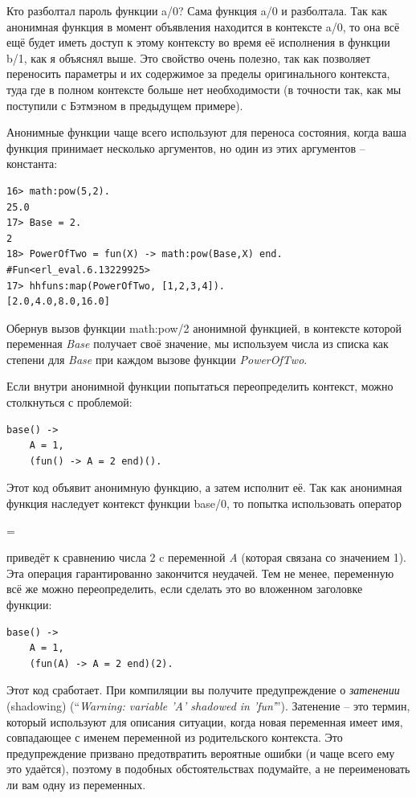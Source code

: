 \documentclass[a4paper,12pt]{report}
\newcommand{\ops}{\colorbox{lgreen}}
\begin{document}
Кто разболтал пароль функции \ops{a/0}? Сама функция \ops{a/0} и разболтала. Так как анонимная функция в момент объявления находится в контексте \ops{a/0}, то она всё ещё будет иметь доступ к этому контексту во время её исполнения в функции \ops{b/1}, как я объяснял выше. Это свойство очень полезно, так как позволяет переносить параметры и их содержимое за пределы оригинального контекста, туда где в полном контексте больше нет необходимости (в точности так, как мы поступили с Бэтмэном в предыдущем примере).

Анонимные функции чаще всего используют для переноса состояния, когда ваша функция принимает несколько аргументов, но один из этих аргументов \--- константа:
\begin{lstlisting}[style=erlang]
16> math:pow(5,2).
25.0
17> Base = 2.
2
18> PowerOfTwo = fun(X) -> math:pow(Base,X) end.
#Fun<erl_eval.6.13229925>
17> hhfuns:map(PowerOfTwo, [1,2,3,4]).
[2.0,4.0,8.0,16.0]
\end{lstlisting}

Обернув вызов функции \ops{math:pow/2} анонимной функцией, в контексте которой переменная \emph{Base} получает своё значение, мы используем числа из списка как степени для \emph{Base} при каждом вызове функции \emph{PowerOfTwo}.

Если внутри анонимной функции попытаться переопределить контекст, можно столкнуться с проблемой:
\begin{lstlisting}[style=erlang]
base() ->
    A = 1,
    (fun() -> A = 2 end)().
\end{lstlisting}

Этот код объявит анонимную функцию, а затем исполнит её. Так как анонимная функция наследует контекст функции \ops{base/0}, то попытка использовать оператор \ops{=\strut} приведёт к сравнению числа 2 c переменной \emph{A} (которая связана со значением 1). Эта операция гарантированно закончится неудачей. Тем не менее, переменную всё же можно переопределить, если сделать это во вложенном заголовке функции:
\begin{lstlisting}[style=erlang]
base() ->
    A = 1,
    (fun(A) -> A = 2 end)(2).
\end{lstlisting}

Этот код сработает. При компиляции вы получите предупреждение о \emph{затенении} (shadowing) (``\emph{Warning: variable 'A' shadowed in 'fun'}''). Затенение \--- это термин, который используют для описания ситуации, когда новая переменная имеет имя, совпадающее с именем переменной из родительского контекста. Это предупреждение призвано предотвратить вероятные ошибки (и чаще всего ему это удаётся), поэтому в подобных обстоятельствах подумайте, а не переименовать ли вам одну из переменных.
\end{document}
